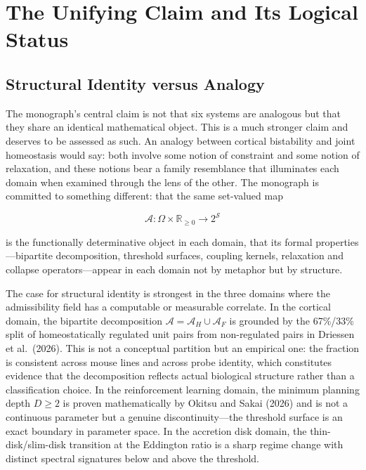 \documentclass[12pt, a4paper]{article}
\theoremstyle{definition}
\begin{document}
\newpage

\tableofcontents

\newpage

\section{The Unifying Claim and Its Logical Status}

\subsection{Structural Identity versus Analogy}

The monograph's central claim is not that six systems are analogous but that they share an identical mathematical object. This is a much stronger claim and deserves to be assessed as such. An analogy between cortical bistability and joint homeostasis would say: both involve some notion of constraint and some notion of relaxation, and these notions bear a family resemblance that illuminates each domain when examined through the lens of the other. The monograph is committed to something different: that the same set-valued map

\begin{equation}
\mathcal{A} : \Omega \times \mathbb{R}_{\geq 0} \longrightarrow 2^\mathcal{S}
\end{equation}

is the functionally determinative object in each domain, that its formal properties---bipartite decomposition, threshold surfaces, coupling kernels, relaxation and collapse operators---appear in each domain not by metaphor but by structure.

The case for structural identity is strongest in the three domains where the admissibility field has a computable or measurable correlate. In the cortical domain, the bipartite decomposition $\mathcal{A} = \mathcal{A}_H \cup \mathcal{A}_F$ is grounded by the 67\%/33\% split of homeostatically regulated unit pairs from non-regulated pairs in Driessen et al.\ (2026). This is not a conceptual partition but an empirical one: the fraction is consistent across mouse lines and across probe identity, which constitutes evidence that the decomposition reflects actual biological structure rather than a classification choice. In the reinforcement learning domain, the minimum planning depth $D \geq 2$ is proven mathematically by Okitsu and Sakai (2026) and is not a continuous parameter but a genuine discontinuity---the threshold surface is an exact boundary in parameter space. In the accretion disk domain, the thin-disk/slim-disk transition at the Eddington ratio is a sharp regime change with distinct spectral signatures below and above the threshold.
\end{document}
